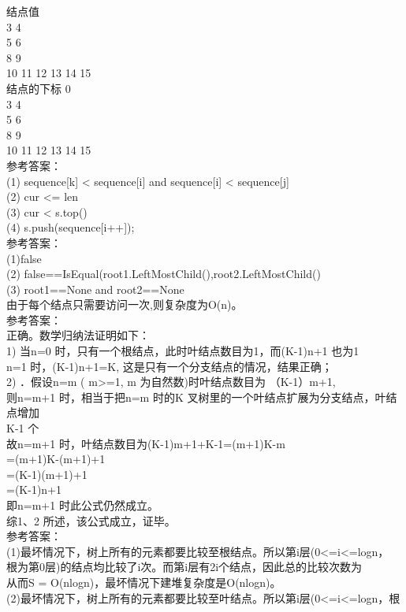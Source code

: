 \begin{question}
\begin{solution}
结点值\\
3 4\\
5 6\\
8 9\\
10 11 12 13 14 15\\
结点的下标 0\\
3 4\\
5 6\\
8 9\\
10 11 12 13 14 15\\
参考答案：\\
(1) sequence[k] < sequence[i] and sequence[i] < sequence[j]\\
(2) cur <= len\\
(3) cur < s.top()\\
(4) s.push(sequence[i++]);\\
参考答案：\\
(1)false\\
(2) false==IsEqual(root1.LeftMostChild(),root2.LeftMostChild()\\
(3) root1==None and root2==None\\
由于每个结点只需要访问一次,则复杂度为O(n)。\\
参考答案：\\
正确。数学归纳法证明如下：\\
1) 当n=0 时，只有一个根结点，此时叶结点数目为1，而(K-1)n+1 也为1\\
n=1 时，(K-1)n+1=K, 这是只有一个分支结点的情况，结果正确；\\
2) ．假设n=m ( m>=1, m 为自然数)时叶结点数目为 （K-1）m+1,\\
则n=m+1 时，相当于把n=m 时的K 叉树里的一个叶结点扩展为分支结点，叶结点增加\\
K-1 个\\
故n=m+1 时，叶结点数目为(K-1)m+1+K-1=(m+1)K-m\\
=(m+1)K-(m+1)+1\\
=(K-1)(m+1)+1\\
=(K-1)n+1\\
即n=m+1 时此公式仍然成立。\\
综1、2 所述，该公式成立，证毕。\\
参考答案：\\
(1)最坏情况下，树上所有的元素都要比较至根结点。所以第i层(0<=i<=logn，\\
根为第0层)的结点均比较了i次。而第i层有2i个结点，因此总的比较次数为\\
从而S = O(nlogn)，最坏情况下建堆复杂度是O(nlogn)。\\
(2)最坏情况下，树上所有的元素都要比较至叶结点。所以第i层(0<=i<=logn，根\\

\end{solution}
\end{question}
